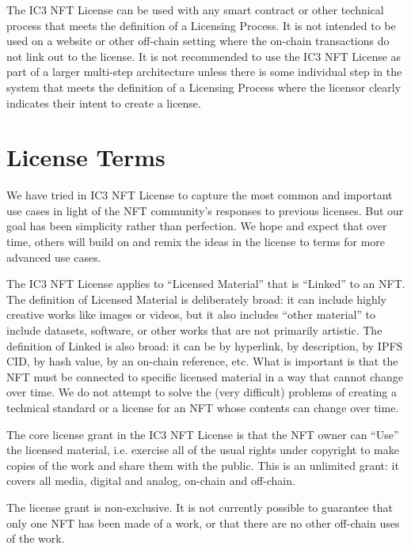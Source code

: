 \documentclass{article}
\newcommand{\iccclicense}{IC3 NFT License\xspace}
\begin{document}
The \iccclicense can be used with any smart contract or other technical process that meets the definition of a Licensing Process. It is not intended to be used on a website or other off-chain setting where the on-chain transactions do not link out to the license. It is not recommended to use the \iccclicense as part of a larger multi-step architecture unless there is some individual step in the system that meets the definition of a Licensing Process where the licensor clearly indicates their intent to create a license.


\section{License Terms}

We have tried in \iccclicense to capture the most common and important use cases in light of the NFT community's responses to previous licenses. But our goal has been simplicity rather than perfection. We hope and expect that over time, others will build on and remix the ideas in the license to terms for more advanced use cases.

The \iccclicense applies to ``Licensed Material'' that is ``Linked'' to an NFT. The definition of Licensed Material is deliberately broad: it can include highly creative works like images or videos, but it also includes ``other material'' to include datasets, software, or other works that are not primarily artistic. The definition of Linked is also broad: it can be by hyperlink, by description, by IPFS CID, by hash value, by an on-chain reference, etc. What is important is that the NFT must be connected to specific licensed material in a way that cannot change over time. We do not attempt to solve the (very difficult) problems of creating a technical standard or a license for an NFT whose contents can change over time.

The core license grant in the \iccclicense is that the NFT owner can ``Use'' the licensed material, i.e. exercise all of the usual rights under copyright to make copies of the work and share them with the public. This is an unlimited grant: it covers all media, digital and analog, on-chain and off-chain. 

The license grant is non-exclusive. It is not currently possible to guarantee that only one NFT has been made of a work, or that there are no other off-chain uses of the work.
\end{document}
